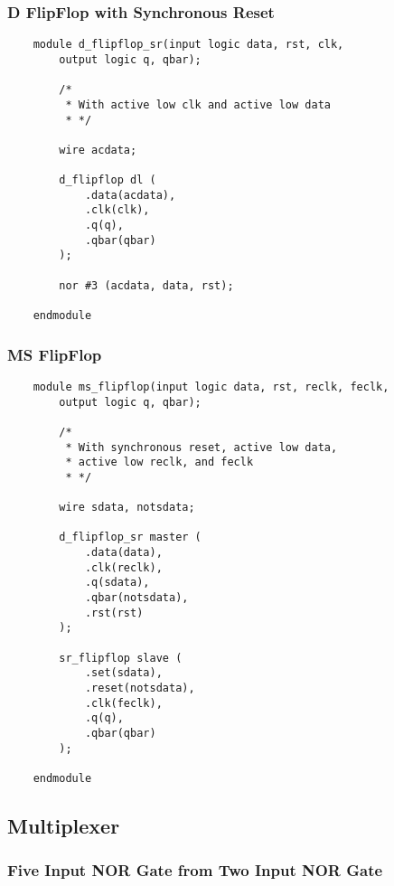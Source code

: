 \documentclass[../main]{subfiles}
\begin{document}
\subsubsection {D FlipFlop with Synchronous Reset}

\begin{verbatim}
    module d_flipflop_sr(input logic data, rst, clk,
        output logic q, qbar);

        /*
         * With active low clk and active low data
         * */

        wire acdata;

        d_flipflop dl (
            .data(acdata),
            .clk(clk),
            .q(q),
            .qbar(qbar)
        );

        nor #3 (acdata, data, rst);

    endmodule
\end{verbatim}

\subsubsection {MS FlipFlop}

\begin{verbatim}
    module ms_flipflop(input logic data, rst, reclk, feclk,
        output logic q, qbar);

        /*
         * With synchronous reset, active low data,
         * active low reclk, and feclk
         * */

        wire sdata, notsdata;

        d_flipflop_sr master (
            .data(data),
            .clk(reclk),
            .q(sdata),
            .qbar(notsdata),
            .rst(rst)
        );

        sr_flipflop slave (
            .set(sdata),
            .reset(notsdata),
            .clk(feclk),
            .q(q),
            .qbar(qbar)
        );

    endmodule
\end{verbatim}

\subsection{Multiplexer}

\subsubsection {Five Input NOR Gate from Two Input NOR Gate}
\end{document}

